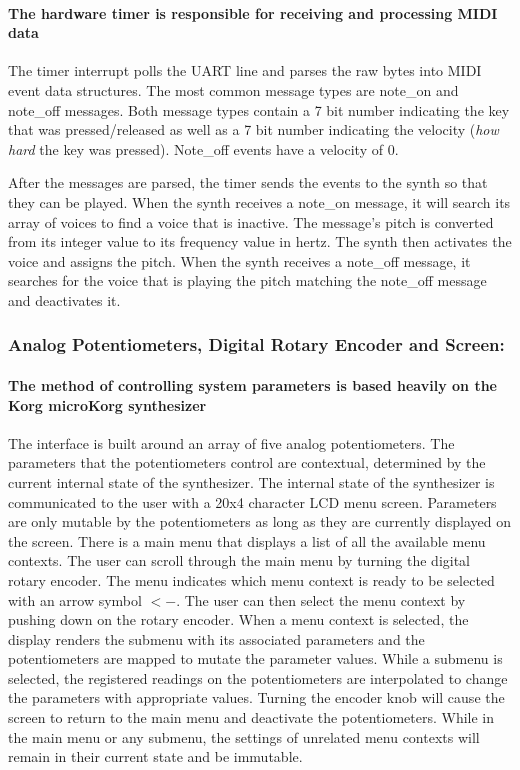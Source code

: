 \documentclass[acmlarge,screen]{acmart}
\begin{document}
	\paragraph{The hardware timer is responsible for receiving and processing MIDI data} The timer interrupt polls the UART line and parses the raw bytes into MIDI event data structures. The most common message types are note\_on and note\_off messages. Both message types contain a 7 bit number indicating the key that was pressed/released as well as a 7 bit number indicating the velocity (\textit{how hard} the key was pressed). Note\_off events have a velocity of 0.\cite{huber_2007} 
	
	After the messages are parsed, the timer sends the events to the synth so that they can be played. When the synth receives a note\_on message, it will search its array of voices to find a voice that is inactive. The message's pitch is converted from its integer value to its frequency value in hertz. The synth then activates the voice and assigns the pitch. When the synth receives a note\_off message, it searches for the voice that is playing the pitch matching the note\_off message and deactivates it.
	
	\subsubsection{Analog Potentiometers, Digital Rotary Encoder and Screen:}
	\paragraph{The method of controlling system parameters is based heavily on the Korg microKorg synthesizer} The interface is built around an array of five analog potentiometers. The parameters that the potentiometers control are contextual, determined by the current internal state of the synthesizer. The internal state of the synthesizer is communicated to the user with a 20x4 character LCD menu screen. Parameters are only mutable by the potentiometers as long as they are currently displayed on the screen. There is a main menu that displays a list of all the available menu contexts. The user can scroll through the main menu by turning the digital rotary encoder. The menu indicates which menu context is ready to be selected with an arrow symbol $<$$-$. The user can then select the menu context by pushing down on the rotary encoder. When a menu context is selected, the display renders the submenu with its associated parameters and the potentiometers are mapped to mutate the parameter values. While a submenu is selected, the registered readings on the potentiometers are interpolated to change the parameters with appropriate values. Turning the encoder knob will cause the screen to return to the main menu and deactivate the potentiometers. While in the main menu or any submenu, the settings of unrelated menu contexts will remain in their current state and be immutable.
	
\end{document}
